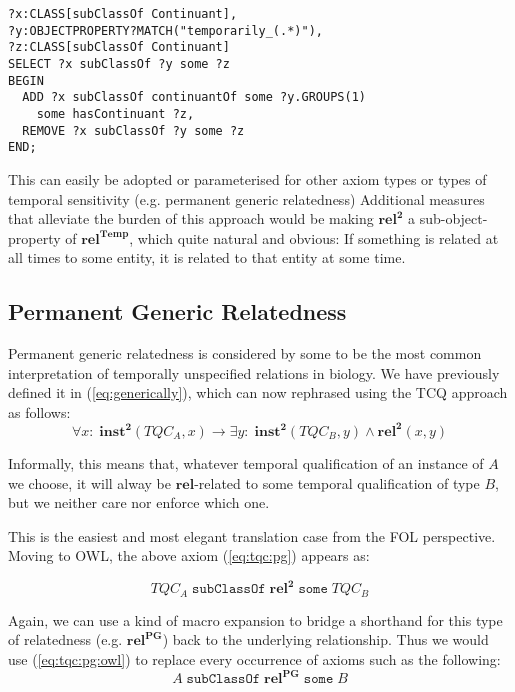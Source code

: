 \documentclass[10pt]{bmc_article}
\newcommand{\mirel}[1]{\ensuremath{\mathrm{\mathbf{#1}}}}
\newcommand{\mclass}[1]{\ensuremath{\mathit{#1}}}
\newcommand{\mrel}[2]{\mirel{#1^#2}}
\newcommand{\mrelb}[1]{\mrel{#1}{2}}
\newcommand{\TQC}[1]{\ensuremath{TQC_{\mclass{#1}}}}
\newcommand{\mreltemp}[1]{\mrel{#1}{{Temp}}}
\newcommand{\mrelpg}[1]{\mrel{#1}{{PG}}}
\newenvironment{bmcformat}{\baselineskip20pt\sloppy\setboolean{publ}{false}}{\baselineskip20pt\sloppy}
\begin{document}
\begin{bmcformat}
\begin{lstlisting}
?x:CLASS[subClassOf Continuant],
?y:OBJECTPROPERTY?MATCH("temporarily_(.*)"),
?z:CLASS[subClassOf Continuant]
SELECT ?x subClassOf ?y some ?z
BEGIN
  ADD ?x subClassOf continuantOf some ?y.GROUPS(1) 
    some hasContinuant ?z,
  REMOVE ?x subClassOf ?y some ?z
END;
\end{lstlisting}
This can easily be adopted or parameterised for other axiom types or types of temporal
sensitivity (e.g. permanent generic relatedness) Additional measures that alleviate the burden of this approach would be making
\mrelb{rel} a sub-object-property of \mreltemp{rel}, which quite natural and
obvious: If something is related at all times to some entity, it is related to
that entity at some time.


\subsection*{Permanent Generic Relatedness}
Permanent generic relatedness is considered by some to be the most common
interpretation of temporally unspecified relations in biology. We have
previously defined it in (\ref{eq:generically}), which can
now rephrased using the TCQ approach as follows:
\begin{equation}
\forall x:\; \mrelb{inst}(\TQC{A},x) \rightarrow \exists y :\;
\mrelb{inst}(\TQC{B}, y) \wedge \mrelb{rel}(x,y)
\label{eq:tqc:pg}
\end{equation}

Informally, this means that, whatever temporal qualification of an instance of
\mclass{A} we choose, it will alway be \mirel{rel}-related to some temporal
qualification of type \mclass{B}, but we neither care nor enforce which one.

This is the easiest and most elegant translation case from the FOL perspective.
Moving to OWL, the above axiom (\ref{eq:tqc:pg}) appears as: 

\begin{equation}
\TQC{A}\;\mathtt{subClassOf}\;\mrelb{rel}\;\mathtt{some}\;\TQC{B}
\label{eq:tqc:pg:owl}
\end{equation}

Again, we can use a kind of macro expansion to bridge a shorthand for this type
of relatedness (e.g. \mrelpg{rel}) back to the
underlying relationship. Thus we would use (\ref{eq:tqc:pg:owl}) to replace
every occurrence of axioms such as the following:
\begin{equation}
\mclass{A}\;\mathtt{subClassOf}\;\mrelpg{rel}\;\mathtt{some}\;\mclass{B}  
\label{eq:tqc:pg:shorthand}
\end{equation}


\end{bmcformat}
\end{document}

